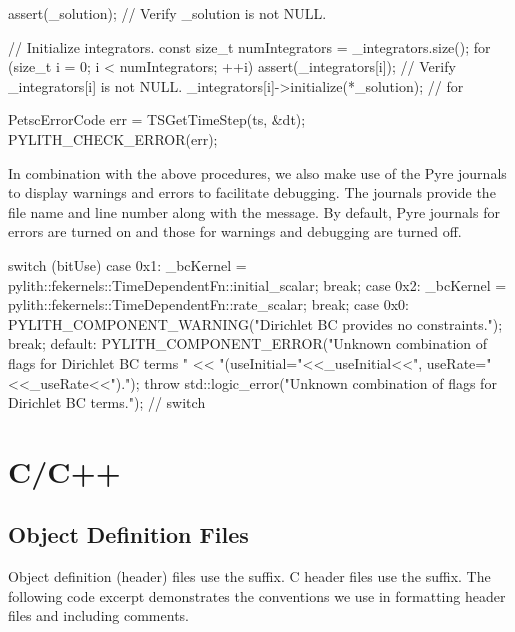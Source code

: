 \begin{cplusplus}
    assert(_solution); // Verify _solution is not NULL.

    // Initialize integrators.
    const size_t numIntegrators = _integrators.size();
    for (size_t i = 0; i < numIntegrators; ++i) {
        assert(_integrators[i]); // Verify _integrators[i] is not NULL.
        _integrators[i]->initialize(*_solution);
    } // for  
\end{cplusplus}


\begin{cplusplus}
  PetscErrorCode err = TSGetTimeStep(ts, &dt); PYLITH_CHECK_ERROR(err);
\end{cplusplus}

In combination with the above procedures, we also make use of the Pyre
journals to display warnings and errors to facilitate debugging. The
journals provide the file name and line number along with the
message. By default, Pyre journals for errors are turned on and those
for warnings and debugging are turned off.

\begin{cplusplus}
    switch (bitUse) {
    case 0x1:
        _bcKernel = pylith::fekernels::TimeDependentFn::initial_scalar;
        break;
    case 0x2:
        _bcKernel = pylith::fekernels::TimeDependentFn::rate_scalar;
        break;
    case 0x0:
        PYLITH_COMPONENT_WARNING("Dirichlet BC provides no constraints.");
        break;
    default:
        PYLITH_COMPONENT_ERROR("Unknown combination of flags for Dirichlet BC terms "
            << "(useInitial="<<_useInitial<<", useRate="<<_useRate<<").");
        throw std::logic_error("Unknown combination of flags for Dirichlet BC terms.");
    } // switch
\end{cplusplus}


\section{C/C++}

\subsection{Object Definition Files}

Object definition (header) files use the  suffix. C
header files use the  suffix. The following code excerpt
demonstrates the conventions we use in formatting header files and
including comments.

